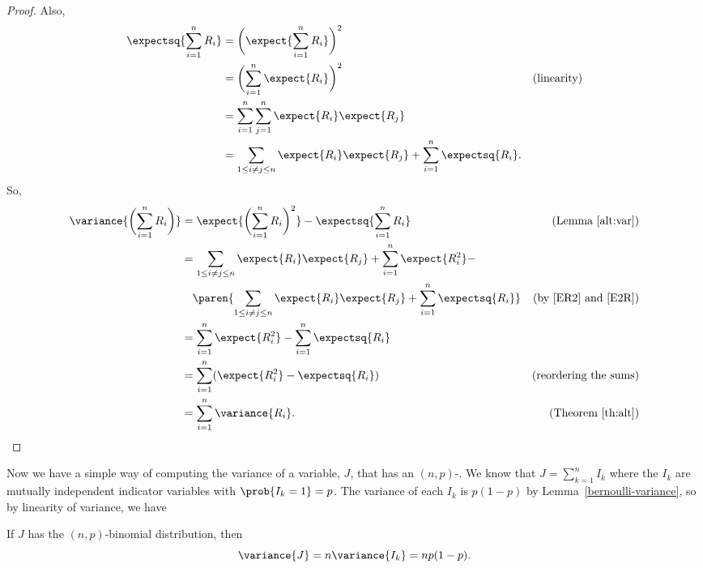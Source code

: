 \begin{editingnotes}
\begin{proof}
Also,
\begin{align}
\expectsq{\sum_{i=1}^n R_i} & = \biggl(\expect{\sum_{i=1}^n R_i}\biggr)^2 \notag\\
  &  = \biggl(\sum_{i=1}^n \expect{R_i}\biggr)^2 &\text{(linearity)} \notag\\
  &  = \sum_{i=1}^n \sum_{j=1}^n \expect{R_i} \expect{R_j}\notag\\
  & = \sum_{1\le i \neq j \le n} \expect{R_i}\expect{R_j} + \sum_{i=1}^n
     \expectsq{R_i}.\label{E2R}
\end{align}
So,
\begin{align*}
\variance{\biggl(\sum_{i=1}^n R_i\biggr)}
   & =  \expect{\biggl(\sum_{i=1}^n R_i\biggr)^2} -
\expectsq{\sum_{i=1}^n R_i}  & \text{(Lemma~\ref{alt:var})}\\
   &  = \sum_{1\le i \neq j \le n} \expect{R_i} \expect{R_j}
        + \sum_{i=1}^n \expect{R_i^2} - \\
   & \quad \paren{\sum_{1\le i \neq j \le n} \expect{R_i}\expect{R_j}
        + \sum_{i=1}^n \expectsq{R_i}}
      & \text{(by~\eqref{ER2} and~\eqref{E2R})}\\
   & = \sum_{i=1}^n \expect{R_i^2} - \sum_{i=1}^n \expectsq{R_i}\\
   & = \sum_{i=1}^n (\expect{R_i^2} - \expectsq{R_i})
             & \text{(reordering the sums)}\\
   & = \sum_{i=1}^n \variance{R_i}. & \text{(Theorem~\ref{th:alt})}
\end{align*}
\fi
\end{proof}
\end{editingnotes}


Now we have a simple way of computing the variance of a variable, $J$,
that has an $(n,p)$-.  We know that $J =
\sum_{k=1}^n I_k$ where the $I_k$ are mutually independent indicator
variables with $\prob{I_k=1}=p$.  The variance of each $I_k$ is $p(1-p)$
by Lemma~\ref{bernoulli-variance}, so by linearity of variance, we have
\begin{lemma*}
If $J$ has the $(n,p)$-binomial distribution, then
\begin{equation}\label{p1p}
\variance{J} = n \variance{I_k} = np(1-p).
\end{equation}
\end{lemma*}

\begin{problems}
\practiceproblems
{}

\classproblems
{}

\homeworkproblems
{}
\end{problems}

